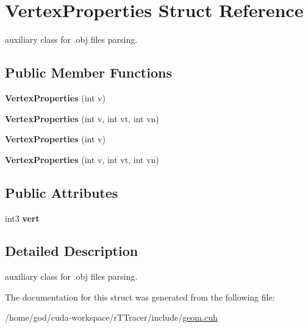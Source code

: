 \hypertarget{struct_vertex_properties}{}\section{Vertex\+Properties Struct Reference}
\label{struct_vertex_properties}


auxiliary class for .obj files parsing.  


\subsection*{Public Member Functions}
\begin{DoxyCompactItemize}
\item 
{\bfseries Vertex\+Properties} (int v)\hypertarget{struct_vertex_properties_addd3e65fd4731113b8d2912a5ae62c1e}{}\label{struct_vertex_properties_addd3e65fd4731113b8d2912a5ae62c1e}

\item 
{\bfseries Vertex\+Properties} (int v, int vt, int vn)\hypertarget{struct_vertex_properties_ad6e681f2c6ef779436db3349b8a2a06e}{}\label{struct_vertex_properties_ad6e681f2c6ef779436db3349b8a2a06e}

\item 
{\bfseries Vertex\+Properties} (int v)\hypertarget{struct_vertex_properties_addd3e65fd4731113b8d2912a5ae62c1e}{}\label{struct_vertex_properties_addd3e65fd4731113b8d2912a5ae62c1e}

\item 
{\bfseries Vertex\+Properties} (int v, int vt, int vn)\hypertarget{struct_vertex_properties_ad6e681f2c6ef779436db3349b8a2a06e}{}\label{struct_vertex_properties_ad6e681f2c6ef779436db3349b8a2a06e}

\end{DoxyCompactItemize}
\subsection*{Public Attributes}
\begin{DoxyCompactItemize}
\item 
int3 {\bfseries vert}\hypertarget{struct_vertex_properties_aaad2a462f8f48c85a08f6891a6d974fa}{}\label{struct_vertex_properties_aaad2a462f8f48c85a08f6891a6d974fa}

\end{DoxyCompactItemize}


\subsection{Detailed Description}
auxiliary class for .obj files parsing. 

The documentation for this struct was generated from the following file\+:\begin{DoxyCompactItemize}
\item 
/home/god/cuda-\/workspace/r\+T\+Tracer/include/\hyperlink{r_t_tracer_2include_2geom_8cuh}{geom.\+cuh}\end{DoxyCompactItemize}
